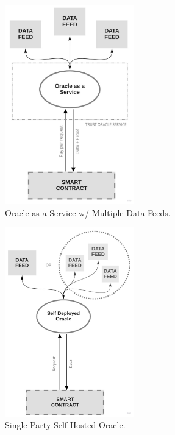\begin{figure}[t]
  \begin{center}
    \leavevmode
    \includegraphics[width=0.5\textwidth]{figures/oraclearch2.jpg}
    \caption{Oracle as a Service w/ Multiple Data Feeds.}
    \label{fig:/figures/paper-screening}
  \end{center}
\end{figure}

\begin{figure}[t]
  \begin{center}
    \leavevmode
    \includegraphics[width=0.5\textwidth]{figures/oraclearch3.jpg}
    \caption{Single-Party Self Hosted Oracle.}
    \label{fig:/figures/paper-screening}
  \end{center}
\end{figure}

